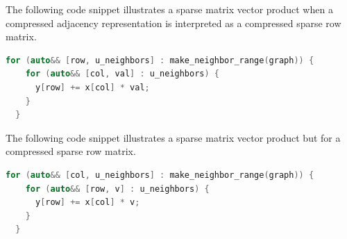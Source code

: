The following code snippet illustrates a sparse matrix vector product when a compressed adjacency representation  is interpreted as a compressed sparse row matrix.
\begin{lstlisting}[language=C++]
  for (auto&& [row, u_neighbors] : make_neighbor_range(graph)) {
    for (auto&& [col, val] : u_neighbors) {
      y[row] += x[col] * val;
    }
  }
\end{lstlisting}

The following code snippet illustrates a sparse matrix vector product but for a compressed sparse row matrix.
\begin{lstlisting}[language=C++]
  for (auto&& [col, u_neighbors] : make_neighbor_range(graph)) {
    for (auto&& [row, v] : u_neighbors) {
      y[row] += x[col] * v;
    }
  }
\end{lstlisting}
